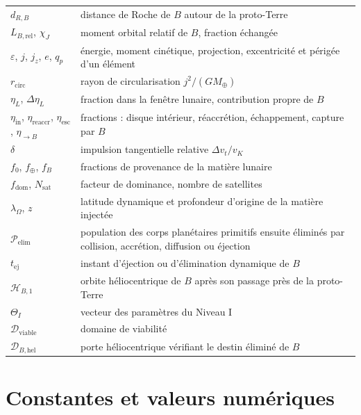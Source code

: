 \documentclass[11pt,a4paper,openany]{report}
\newcommand{\Mt}{M_{\oplus}}
\begin{document}
\begin{longtable}{>{\raggedright\arraybackslash}p{3.2cm}>{\raggedright\arraybackslash}p{11.6cm}}
$d_{R,B}$ & distance de Roche de $B$ autour de la proto-Terre \\
$L_{B,\mathrm{rel}}$, $\chi_J$ & moment orbital relatif de $B$, fraction échangée \\
$\varepsilon$, $j$, $j_z$, $e$, $q_p$ & énergie, moment cinétique, projection, excentricité et périgée d'un élément \\
$r_{\mathrm{circ}}$ & rayon de circularisation $j^2/(G\Mt)$ \\
$\eta_L$, $\Delta\eta_L$ & fraction dans la fenêtre lunaire, contribution propre de $B$ \\
$\eta_{\mathrm{in}}$, $\eta_{\mathrm{reaccr}}$, $\eta_{\mathrm{esc}}$, $\eta_{\to B}$ & fractions : disque intérieur, réaccrétion, échappement, capture par $B$ \\
$\delta$ & impulsion tangentielle relative $\Delta v_t/v_K$ \\
$f_0$, $f_\oplus$, $f_B$ & fractions de provenance de la matière lunaire \\
$f_{\mathrm{dom}}$, $N_{\mathrm{sat}}$ & facteur de dominance, nombre de satellites \\
$\lambda_\Omega$, $z$ & latitude dynamique et profondeur d'origine de la matière injectée \\
$\mathcal{P}_{\mathrm{elim}}$ & population des corps planétaires primitifs ensuite éliminés par collision, accrétion, diffusion ou éjection \\
$t_{\mathrm{ej}}$ & instant d'éjection ou d'élimination dynamique de $B$ \\
$\mathcal{H}_{B,1}$ & orbite héliocentrique de $B$ après son passage près de la proto-Terre \\
$\Theta_I$ & vecteur des paramètres du Niveau I \\
$\mathcal{D}_{\mathrm{viable}}$ & domaine de viabilité \\
$\mathcal{D}_{B,\mathrm{hel}}$ & porte héliocentrique vérifiant le destin éliminé de $B$ \\
\bottomrule
\end{longtable}
\normalsize

\chapter{Constantes et valeurs numériques}
\label{app:constantes}
\end{document}
